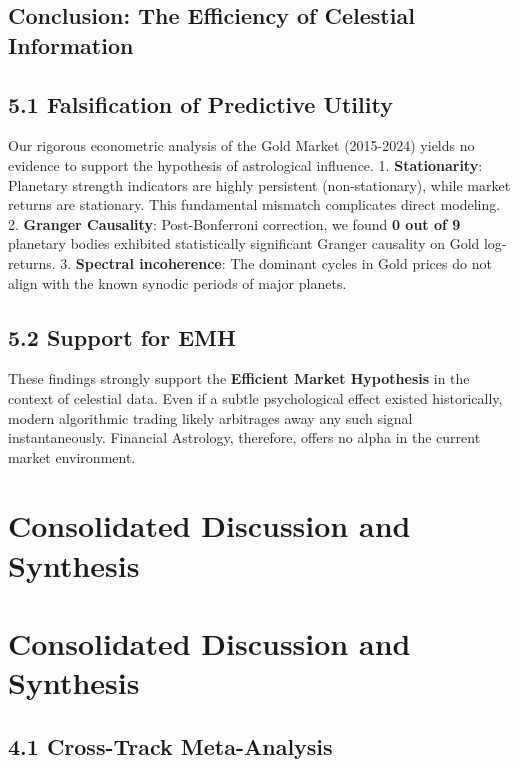\documentclass[
  11pt,
  a4paper,
  oneside,
  openany]{report}
\begin{document}
\section{Conclusion: The Efficiency of Celestial
Information}\label{conclusion-the-efficiency-of-celestial-information}

\section{5.1 Falsification of Predictive
Utility}\label{falsification-of-predictive-utility}

Our rigorous econometric analysis of the Gold Market (2015-2024) yields
no evidence to support the hypothesis of astrological influence. 1.
\textbf{Stationarity}: Planetary strength indicators are highly
persistent (non-stationary), while market returns are stationary. This
fundamental mismatch complicates direct modeling. 2. \textbf{Granger
Causality}: Post-Bonferroni correction, we found \textbf{0 out of 9}
planetary bodies exhibited statistically significant Granger causality
on Gold log-returns. 3. \textbf{Spectral incoherence}: The dominant
cycles in Gold prices do not align with the known synodic periods of
major planets.

\section{5.2 Support for EMH}\label{support-for-emh}

These findings strongly support the \textbf{Efficient Market Hypothesis}
in the context of celestial data. Even if a subtle psychological effect
existed historically, modern algorithmic trading likely arbitrages away
any such signal instantaneously. Financial Astrology, therefore, offers
no alpha in the current market environment.

\newpage

\chapter{Consolidated Discussion and
Synthesis}\label{consolidated-discussion-and-synthesis}

\chapter{Consolidated Discussion and
Synthesis}\label{consolidated-discussion-and-synthesis-1}

\section{4.1 Cross-Track Meta-Analysis}\label{cross-track-meta-analysis}
\end{document}
